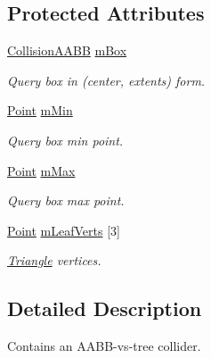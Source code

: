 \subsection*{Protected Attributes}
\begin{DoxyCompactItemize}
\item 
\hypertarget{class_a_a_b_b_collider_aef6bd97ceed9bca72a3896aa3e41749e}{\hyperlink{class_collision_a_a_b_b}{Collision\+A\+A\+B\+B} \hyperlink{class_a_a_b_b_collider_aef6bd97ceed9bca72a3896aa3e41749e}{m\+Box}}\label{class_a_a_b_b_collider_aef6bd97ceed9bca72a3896aa3e41749e}

\begin{DoxyCompactList}\small\item\em Query box in (center, extents) form. \end{DoxyCompactList}\item 
\hypertarget{class_a_a_b_b_collider_a8c00192504356f5016957e9a034dfeeb}{\hyperlink{class_point}{Point} \hyperlink{class_a_a_b_b_collider_a8c00192504356f5016957e9a034dfeeb}{m\+Min}}\label{class_a_a_b_b_collider_a8c00192504356f5016957e9a034dfeeb}

\begin{DoxyCompactList}\small\item\em Query box min point. \end{DoxyCompactList}\item 
\hypertarget{class_a_a_b_b_collider_af40446c606f2d4a02d515a58696d272d}{\hyperlink{class_point}{Point} \hyperlink{class_a_a_b_b_collider_af40446c606f2d4a02d515a58696d272d}{m\+Max}}\label{class_a_a_b_b_collider_af40446c606f2d4a02d515a58696d272d}

\begin{DoxyCompactList}\small\item\em Query box max point. \end{DoxyCompactList}\item 
\hypertarget{class_a_a_b_b_collider_a3357982377483d5d131721ae72e36643}{\hyperlink{class_point}{Point} \hyperlink{class_a_a_b_b_collider_a3357982377483d5d131721ae72e36643}{m\+Leaf\+Verts} \mbox{[}3\mbox{]}}\label{class_a_a_b_b_collider_a3357982377483d5d131721ae72e36643}

\begin{DoxyCompactList}\small\item\em \hyperlink{class_triangle}{Triangle} vertices. \end{DoxyCompactList}\end{DoxyCompactItemize}


\subsection{Detailed Description}
Contains an A\+A\+B\+B-\/vs-\/tree collider.

